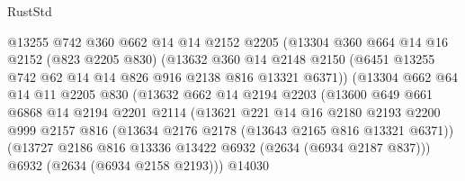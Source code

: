 \begin{lexlean}{RustStd}
\begin{coremodule}
                            @13255
                            @742
                            @360
                            @662
                            @14
                            @14
                            @2152
                            @2205
                            (@13304
                              @360
                              @664
                              @14
                              @16
                              @2152
                              (@823 @2205 @830)
                              (@13632
                                @360
                                @14
                                @2148
                                @2150
                                (@6451 @13255 @742 @62 @14 @14 @826 @916 @2138 @816 @13321 @6371))
                              (@13304
                                @662
                                @64
                                @14
                                @11
                                @2205
                                @830
                                (@13632
                                  @662
                                  @14
                                  @2194
                                  @2203
                                  (@13600
                                    @649
                                    @661
                                    @6868
                                    @14
                                    @2194
                                    @2201
                                    @2114
                                    (@13621
                                      @221
                                      @14
                                      @16
                                      @2180
                                      @2193
                                      @2200
                                      @999
                                      @2157
                                      @816
                                      (@13634 @2176 @2178 (@13643 @2165 @816 @13321 @6371))
                                      (@13727
                                        @2186
                                        @816
                                        @13336
                                        @13422
                                        @6932
                                        (@2634 (@6934 @2187 @837)))
                                      @6932
                                      (@2634 (@6934 @2158 @2193)))
                                    @14030

\end{coremodule}
\end{lexlean}
